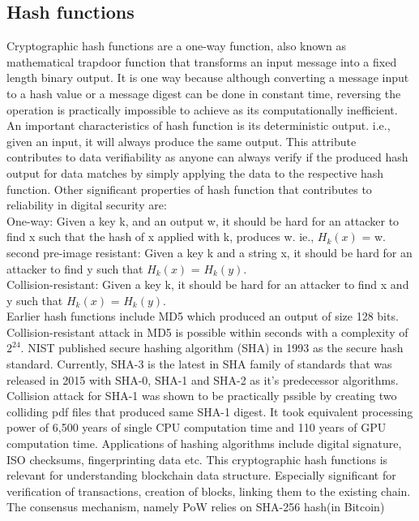 \subsection{Hash functions}
Cryptographic hash functions are a one-way function, also known as mathematical
trapdoor function that transforms an input message into a fixed length binary
output. It is one way because although converting a message input to a hash
value or a message digest can be done in constant time, reversing the operation
is practically impossible to achieve as its computationally inefficient. An
important characteristics of hash function is its deterministic output. i.e.,
given an input, it will always produce the same output. This attribute
contributes to data verifiability as anyone can always verify if the produced
hash output for data matches by simply applying the data to the respective hash
function. 
Other significant properties of hash function that contributes to
reliability in digital security are\cite{mironov2005hash}: \\
One-way: Given a key k, and an output w, it should be hard for an attacker to find x
such that the hash of x applied with k, produces w. ie., $H_k(x)$ = w.\\ 
second pre-image resistant: Given a key k and a string x, it should be hard for
an attacker to find y such that $H_k(x)$ = $H_k(y)$.\\ 
Collision-resistant: Given a key k, it should be hard for an attacker to find x and y such that
$H_k(x)$ = $H_k(y)$. \\
Earlier hash functions include MD5 which produced an output of size 128 bits.
Collision-resistant attack in MD5 is possible within seconds with a complexity
of $2^{24}$\cite{wang2005break}. NIST published secure hashing algorithm (SHA)
in 1993 as the secure hash standard. Currently, SHA-3 is the latest in SHA
family of standards that was released in 2015 with SHA-0, SHA-1 and SHA-2 as
it's predecessor algorithms. Collision attack for SHA-1 was shown to be
practically pssible\cite{stevens2017first} by creating two colliding pdf files
that produced same SHA-1 digest. It took equivalent processing power of 6,500
years of single CPU computation time and 110 years of GPU computation time.
Applications of hashing algorithms include digital signature, ISO checksums,
fingerprinting data etc. This cryptographic hash functions is relevant for
understanding blockchain data structure. Especially significant for
verification of transactions, creation of blocks, linking them to the existing
chain. The consensus mechanism, namely PoW relies on SHA-256 hash(in Bitcoin)
